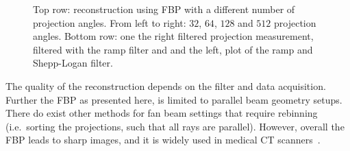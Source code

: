 \begin{figure}
	\centering

	\caption{Top row: reconstruction using \gls{FBP} with a different number of projection
		angles. From left to right: \(32\), \(64\), \(128\) and \(512\) projection angles.
		Bottom row: one the right filtered projection measurement, filtered with the ramp
		filter and and the left, plot of the ramp and Shepp-Logan filter.
	}\label{fig:filtered_backprojection_shepp_logan}
\end{figure}

The quality of the reconstruction depends on the filter and data acquisition. Further the FBP as
presented here, is limited to parallel beam geometry setups. There do exist other methods for fan
beam settings that require rebinning (i.e.\ sorting the projections, such that all rays are
parallel). However, overall the FBP leads to sharp images, and it is widely used in medical CT
scanners~\cite{pan_why_2009}.

